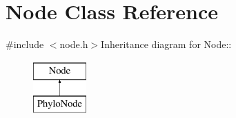 \hypertarget{classNode}{
\section{Node Class Reference}
\label{classNode}
}


{\ttfamily \#include $<$node.h$>$}Inheritance diagram for Node::\begin{figure}[H]
\begin{center}
\leavevmode
\includegraphics[height=2cm]{classNode}
\end{center}
\end{figure}
